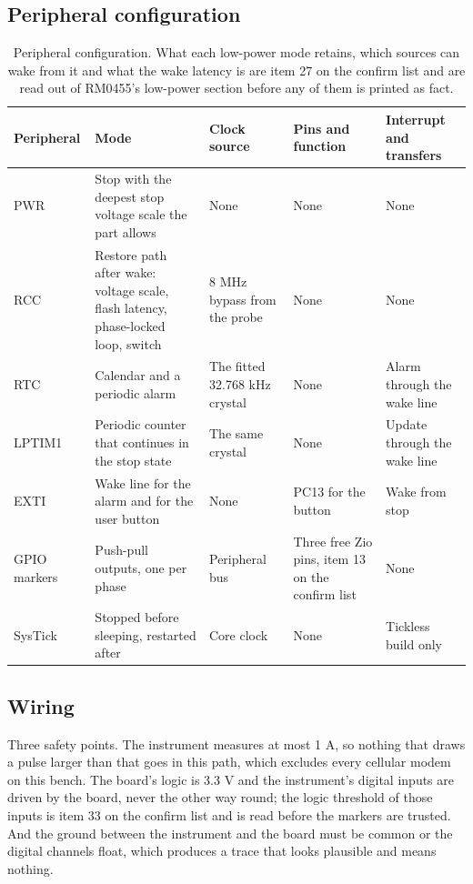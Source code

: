 \subsection*{Peripheral configuration}

\begin{table}[H]\centering\small
\begin{tabular}{p{20mm}p{28mm}p{24mm}p{30mm}p{30mm}}
\toprule
Peripheral & Mode & Clock source & Pins and function & Interrupt and transfers \\
\midrule
PWR & Stop with the deepest stop voltage scale the part allows & None & None & None \\
RCC & Restore path after wake: voltage scale, flash latency, phase-locked loop, switch & 8 MHz bypass from the probe & None & None \\
RTC & Calendar and a periodic alarm & The fitted 32.768 kHz crystal & None & Alarm through the wake line \\
LPTIM1 & Periodic counter that continues in the stop state & The same crystal & None & Update through the wake line \\
EXTI & Wake line for the alarm and for the user button & None & PC13 for the button & Wake from stop \\
GPIO markers & Push-pull outputs, one per phase & Peripheral bus & Three free Zio pins, item 13 on the confirm list & None \\
SysTick & Stopped before sleeping, restarted after & Core clock & None & Tickless build only \\
\bottomrule
\end{tabular}
\caption{Peripheral configuration. What each low-power mode retains, which sources can wake from it and what the wake latency is are item 27 on the confirm list and are read out of RM0455's low-power section before any of them is printed as fact.}
\end{table}

\subsection*{Wiring}


Three safety points. The instrument measures at most 1 A, so nothing that draws
a pulse larger than that goes in this path, which excludes every cellular modem
on this bench. The board's logic is 3.3 V and the instrument's digital inputs
are driven by the board, never the other way round; the logic threshold of
those inputs is item 33 on the confirm list and is read before the markers are
trusted. And the ground between the instrument and the board must be common or
the digital channels float, which produces a trace that looks plausible and
means nothing.

